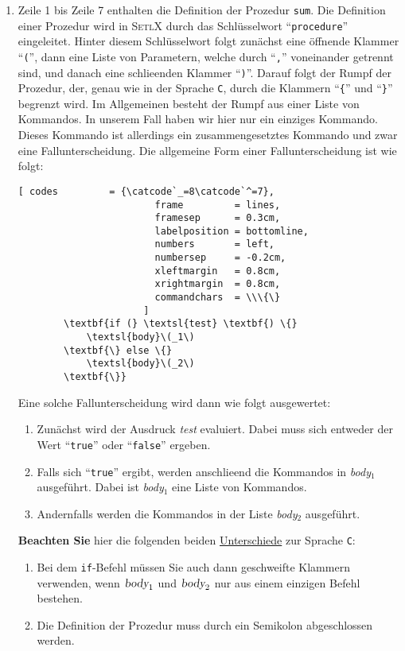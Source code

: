 \begin{enumerate}
\item Zeile 1 bis Zeile 7 enthalten die Definition der Prozedur \texttt{sum}.  Die 
      Definition einer Prozedur wird in \textsc{SetlX} durch das Schl\"{u}sselwort
      ``\texttt{procedure}'' eingeleitet.  Hinter diesem Schl\"{u}sselwort 
      folgt zun\"{a}chst eine \"{o}ffnende Klammer ``\texttt{(}'', dann
      eine Liste von Parametern, welche durch ``\texttt{,}'' voneinander getrennt sind, 
      und danach  eine schlie\3enden Klammer ``\texttt{)}''.
      Darauf folgt der Rumpf der Prozedur, der, genau wie in der Sprache \texttt{C},
      durch die Klammern ``\texttt{\{}'' und
      ``\texttt{\}}'' begrenzt wird.  Im Allgemeinen besteht der Rumpf aus einer
      Liste von Kommandos.  In unserem Fall haben wir hier nur ein einziges Kommando.
      Dieses Kommando ist allerdings ein zusammengesetztes Kommando und zwar eine
      Fallunterscheidung.  Die allgemeine Form einer Fallunterscheidung ist wie folgt:

      \begin{Verbatim}[ codes         = {\catcode`_=8\catcode`^=7},
                        frame         = lines, 
                        framesep      = 0.3cm, 
                        labelposition = bottomline,
                        numbers       = left,
                        numbersep     = -0.2cm,
                        xleftmargin   = 0.8cm,
                        xrightmargin  = 0.8cm,
                        commandchars  = \\\{\}
                      ]
        \textbf{if (} \textsl{test} \textbf{) \{}
            \textsl{body}\(_1\)
        \textbf{\} else \{}
            \textsl{body}\(_2\)
        \textbf{\}}
      \end{Verbatim}
      \vspace*{-0.1cm}
      Eine solche  Fallunterscheidung wird dann wie folgt ausgewertet:
      \begin{enumerate}
      \item Zun\"{a}chst wird der Ausdruck \textsl{test} evaluiert.  Dabei
            muss sich entweder der Wert ``\texttt{true}'' oder ``\texttt{false}'' ergeben.
      \item Falls sich ``\texttt{true}'' ergibt, werden anschlie\3end die Kommandos
            in  \textsl{body}$_1$ ausgef\"{u}hrt.  Dabei ist \textsl{body}$_1$ 
            eine Liste von Kommandos.
      \item Andernfalls werden die Kommandos in der Liste \textsl{body}$_2$ ausgef\"{u}hrt.
      \end{enumerate}
      \textbf{Beachten Sie} hier die folgenden beiden \underline{Unterschiede} zur Sprache \texttt{C}:
      \begin{enumerate}
      \item Bei dem \texttt{if}-Befehl m\"{u}ssen Sie auch dann geschweifte Klammern
            verwenden, wenn $\textsl{body}_1$ und $\textsl{body}_2$ nur aus einem einzigen
            Befehl bestehen.  
      \item Die Definition der Prozedur muss durch ein Semikolon abgeschlossen werden.
      \end{enumerate}
      

\end{enumerate}
